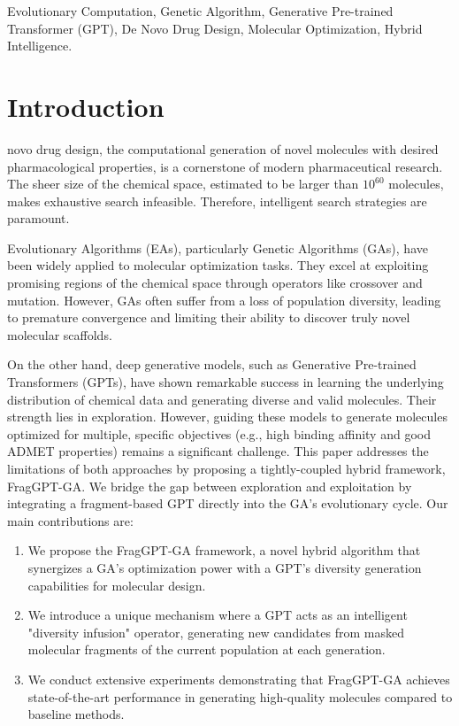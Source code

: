 \documentclass[letterpaper,journal]{IEEEtran}
\begin{document}
\begin{IEEEkeywords}
Evolutionary Computation, Genetic Algorithm, Generative Pre-trained Transformer (GPT), De Novo Drug Design, Molecular Optimization, Hybrid Intelligence.
\end{IEEEkeywords}

\section{Introduction}
 novo drug design, the computational generation of novel molecules with desired pharmacological properties, is a cornerstone of modern pharmaceutical research. The sheer size of the chemical space, estimated to be larger than $10^{60}$ molecules, makes exhaustive search infeasible. Therefore, intelligent search strategies are paramount.

Evolutionary Algorithms (EAs), particularly Genetic Algorithms (GAs), have been widely applied to molecular optimization tasks. They excel at exploiting promising regions of the chemical space through operators like crossover and mutation. However, GAs often suffer from a loss of population diversity, leading to premature convergence and limiting their ability to discover truly novel molecular scaffolds.

On the other hand, deep generative models, such as Generative Pre-trained Transformers (GPTs), have shown remarkable success in learning the underlying distribution of chemical data and generating diverse and valid molecules. Their strength lies in exploration. However, guiding these models to generate molecules optimized for multiple, specific objectives (e.g., high binding affinity and good ADMET properties) remains a significant challenge.
\IEEEpubidadjcol 
This paper addresses the limitations of both approaches by proposing a tightly-coupled hybrid framework, FragGPT-GA. We bridge the gap between exploration and exploitation by integrating a fragment-based GPT directly into the GA's evolutionary cycle. Our main contributions are:
\begin{enumerate}
    \item We propose the FragGPT-GA framework, a novel hybrid algorithm that synergizes a GA's optimization power with a GPT's diversity generation capabilities for molecular design.
    \item We introduce a unique mechanism where a GPT acts as an intelligent "diversity infusion" operator, generating new candidates from masked molecular fragments of the current population at each generation.
    \item We conduct extensive experiments demonstrating that FragGPT-GA achieves state-of-the-art performance in generating high-quality molecules compared to baseline methods.
\end{enumerate}
\end{document}
